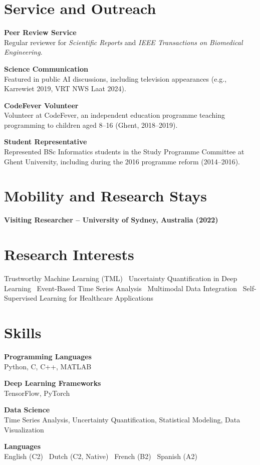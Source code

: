 \documentclass[10.5pt,a4paper]{article}
\newenvironment{cvsection}[1]{%
  \vspace{1.8em}%
  \begin{minipage}[t]{\textwidth}
  \vspace{0pt}%
  \titlespacing{\section}{0pt}{0pt}{0.7em}%
  \section{#1}%
}{%
  \end{minipage}%
  \titlespacing{\section}{0pt}{1.8em}{0.7em}%
}
\newcommand{\cvrow}[2]{%
  {\bfseries #1}\\
  {\small #2}
  \vspace{0.8em}
  \par
}
\begin{document}
\begin{cvsection}{Service and Outreach}

\cvrow{Peer Review Service}{Regular reviewer for \textit{Scientific Reports} and \textit{IEEE Transactions on Biomedical Engineering}.}

\cvrow{Science Communication}{Featured in public AI discussions, including television appearances (e.g., Karrewiet 2019, VRT NWS Laat 2024).}

\cvrow{CodeFever Volunteer}{Volunteer at CodeFever, an independent education programme teaching programming to children aged 8--16 (Ghent, 2018--2019).}

\cvrow{Student Representative}{Represented BSc Informatics students in the Study Programme Committee at Ghent University, including during the 2016 programme reform (2014--2016).}

\end{cvsection}

\begin{cvsection}{Mobility and Research Stays}

\cvrow{Visiting Researcher -- University of Sydney, Australia (2022)}{}

\end{cvsection}

\begin{cvsection}{Research Interests}

\small Trustworthy Machine Learning (TML) \textperiodcentered\ Uncertainty Quantification in Deep Learning \textperiodcentered\ Event-Based Time Series Analysis \textperiodcentered\ Multimodal Data Integration \textperiodcentered\ Self-Supervised Learning for Healthcare Applications

\end{cvsection}

\begin{cvsection}{Skills}

\cvrow{Programming Languages}{Python, C, C++, MATLAB}

\cvrow{Deep Learning Frameworks}{TensorFlow, PyTorch}

\cvrow{Data Science}{Time Series Analysis, Uncertainty Quantification, Statistical Modeling, Data Visualization}

\cvrow{Languages}{English (C2) \textbullet\ Dutch (C2, Native) \textbullet\ French (B2) \textbullet\ Spanish (A2)}

\end{cvsection}
\end{document}
